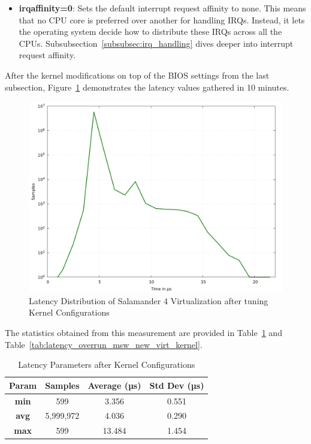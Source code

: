 \documentclass[MMR,Master,english]{style/twbook}
\begin{document}
\begin{itemize}
	\item \textbf{irqaffinity=0}: Sets the default interrupt request affinity to none. This means that no CPU core is preferred over another for handling IRQs. Instead, it lets the operating system decide how to distribute these IRQs across all the CPUs. Subsubsection~\ref{subsubsec:irq_handling} dives deeper into interrupt request affinity.
\end{itemize}

\clearpage

\noindent After the kernel modifications on top of the BIOS settings from the last subsection, Figure~\ref{fig:gnuplot_max_latency_rt_kernelparam} demonstrates the latency values gathered in 10 minutes.

\begin{figure}[H]
	\centering
	\includegraphics[width=0.7\columnwidth]{img/implementation/gnuplot_max_latency_rt_kernelparam.png}
	\caption[Latency Distribution of Salamander 4 after Kernel Configurations]{Latency Distribution of Salamander 4 Virtualization after tuning Kernel Configurations}
	\label{fig:gnuplot_max_latency_rt_kernelparam}
\end{figure}

\noindent The statistics obtained from this measurement are provided in Table~\ref{tab:latency_stats_kernelparam} and Table~\ref{tab:latency_overrun_msw_new_virt_kernel}.

\begin{table}[H]
	\centering
	\caption{Latency Parameters after Kernel Configurations}
	\label{tab:latency_stats_kernelparam}
	\begin{tabular}{|c|c|c|c|}
		\hline
		\textbf{Param} & \textbf{Samples} & \textbf{Average (µs)} & \textbf{Std Dev (µs)} \\ \hline
		\textbf{min}   & 599              & 3.356                 & 0.551                 \\ \hline
		\textbf{avg}   & 5,999,972        & 4.036                 & 0.290                 \\ \hline
		\textbf{max}   & 599              & 13.484                & 1.454                 \\ \hline
	\end{tabular}
\end{table}
\end{document}
